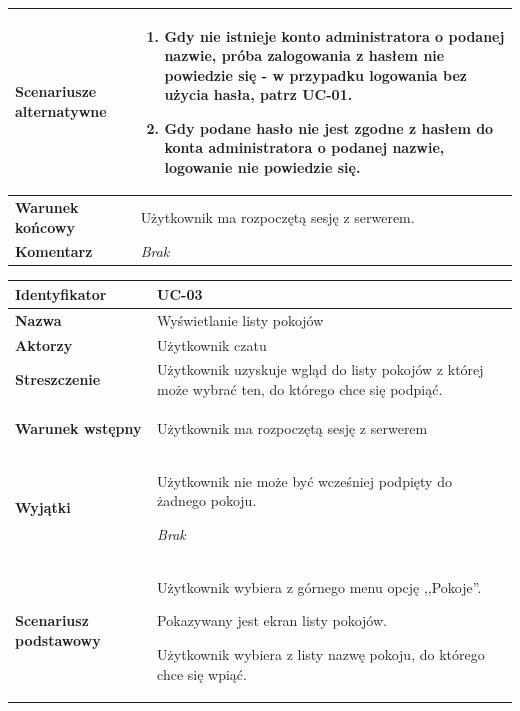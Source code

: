 {\begin{tabularx}{\textwidth}{|l|X|}
	\hline
		\textbf{Scenariusze alternatywne} &
			\begin{enumerate}
				\item Gdy nie istnieje konto administratora o podanej nazwie,
				próba zalogowania z hasłem nie powiedzie się - w przypadku logowania bez
				użycia hasła, patrz UC-01.
				\item Gdy podane hasło nie jest zgodne z hasłem do konta administratora
				o podanej nazwie, logowanie nie powiedzie	się.
			\end{enumerate}
		\\

	\hline
		\textbf{Warunek końcowy} &
			Użytkownik ma rozpoczętą sesję z serwerem.
		\\

	\hline
		\textbf{Komentarz} &
			\textit{Brak}
		\\

	\hline
\end{tabularx}

\vspace{2em}

\begin{tabularx}{\textwidth}{|l|X|}
	\hline
		\textbf{Identyfikator} &
		UC-03
		\\

	\hline
		\textbf{Nazwa} &
		Wyświetlanie listy pokojów
		\\

	\hline
		\textbf{Aktorzy} &
			Użytkownik czatu
		\\

	\hline
		\textbf{Streszczenie} &
			Użytkownik uzyskuje wgląd do listy pokojów z której może wybrać ten, do
			którego chce się podpiąć.
		\\

	\hline
		\textbf{Warunek wstępny} &
			\begin{enumreq}
				\item Użytkownik ma rozpoczętą sesję z serwerem
			\end{enumreq}
		\\

	\hline
		\textbf{Wyjątki} &
			\begin{enumreq}
				\item Użytkownik nie może być wcześniej podpięty do żadnego pokoju.
			\end{enumreq}
			\textit{Brak}
		\\

	\hline
		\textbf{Scenariusz podstawowy} &
			\begin{enumreq}
				\item Użytkownik wybiera z górnego menu opcję ,,Pokoje''.
				\item Pokazywany jest ekran listy pokojów.
				\item Użytkownik wybiera z listy nazwę pokoju, do którego chce
				się wpiąć.
			\end{enumreq}
		\\


\end{tabularx}}
